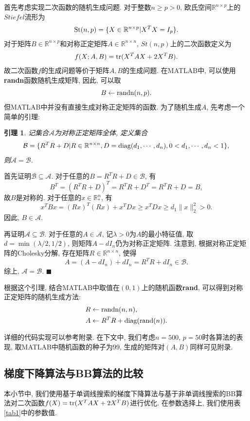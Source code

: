 \documentclass[UTF8]{ctexart}
\newtheorem{lemma}[theorem]{引理}
\newenvironment{proof}{{\textit{证明}:\quad }}{\hfill $\blacksquare$\par}
\begin{document}
首先考虑实现二次函数的随机生成问题. 对于整数$n\geq p>0$, 欧氏空间$\mathbb{R}^{n\times p}$上的$Stiefel$流形为
\[\textup{St}(n,p)=\{X\in\mathbb{R}^{n\times p}|X^T X=I_p\}.\]
对于矩阵$B\in \mathbb{R}^{n\times p}$和对称正定矩阵$A\in\mathbb{R}^{n\times n}$, $St(n,p)$上的二次函数定义为
\[f(X;A,B)=\textup{tr}(X^T AX+2X^T B).\]
故二次函数$f$的生成问题等价于矩阵$A,B$的生成问题. 在MATLAB中, 可以使用\textbf{randn}函数随机生成矩阵, 因此, 可以取
\[B\leftarrow \textup{randn}(n,p).\]
但MATLAB中并没有直接生成对称正定矩阵的函数. 为了随机生成$A$, 先考虑一个简单的引理: 
\begin{lemma}
    记集合$\mathcal{A}$为对称正定矩阵全体, 定义集合
    \[\mathcal{B}=\{R^T R+D|R\in\mathbb{R}^{n\times n}, D=\textup{diag}(d_1,\cdots,d_n), 0<d_1,\cdots,d_n<1\},\]
    则$\mathcal{A}=\mathcal{B}$. 
\end{lemma}
\begin{proof}
    首先证明$\mathcal{B}\subseteq\mathcal{A}$. 对于任意的$B=R^T R+D\in\mathcal{B}$, 有
    \[B^T=(R^T R+D)^T=R^T R+D^T=R^T R+D=B,\]
    故$B$是对称的. 对于任意的$x\in\mathbb{R}^n_*$, 有
    \[x^T Bx=(Rx)^T(Rx)+x^T Dx\geq x^T Dx\geq d_1 \lVert x \rVert_2^2>0.\]
    因此, $B\in\mathcal{A}$.

    再证明$\mathcal{A}\subseteq\mathcal{B}$. 对于任意的$A\in\mathcal{A}$, 记$\lambda>0$为$A$的最小特征值, 取$d=\min(\lambda/2,1/2)$, 则矩阵$A-dI_n$仍为对称正定矩阵. 注意到, 根据对称正定矩阵的Cholesky分解, 存在矩阵$R\in\mathbb{R}^{n\times n}$, 使得
    \[A=(A-dI_n)+dI_n=R^T R+dI_n\in\mathcal{B}.\]
    综上, $\mathcal{A}=\mathcal{B}$. 
\end{proof}

根据这个引理, 结合MATLAB中取值在$(0,1)$上的随机函数\textbf{rand}, 可以得到对称正定矩阵的随机生成方法:
\begin{align*}
    R&\leftarrow \textup{randn}(n,n),\\
    A&\leftarrow R^T R+\textup{diag}(\textup{rand}(n)). 
\end{align*}

详细的代码实现可以参考附录. 在下文中, 我们考虑$n=500$, $p=50$时各算法的表现, 取MATLAB中随机函数的种子为$99$, 生成的矩阵对$(A,B)$同样可见附录.

\subsection{梯度下降算法与BB算法的比较}

本小节中, 我们使用基于单调线搜索的梯度下降算法与基于非单调线搜索的BB算法对二次函数$f(X)=\textup{tr}(X^T AX+2X^T B)$进行优化. 在参数选择上, 我们使用表\ref{tab1}中的参数值. 
\end{document}
